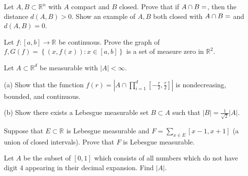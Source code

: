 
\begin{problem}{1}
  Let $A,B \subset \mathbb{R}^{n}$ with $A$ compact and $B$ closed. Prove that if $A \cap B = \empty$, then the distance $d(A,B) > 0$.
  Show an example of $A,B$ both closed with $A \cap B = \empty$ and $d(A,B) = 0$.
\end{problem} 

\begin{solution}
  

  
\end{solution}

\begin{problem}{2}
  Let $ f : [a,b] \to \mathbb{R}^{} $ be continuous. Prove the graph of $f, G(f) = \left\{ (x,f(x)) : x \in [a,b] \right\}$ is a set of measure zero in $\mathbb{R}^{2}$.
\end{problem}
    
\begin{solution}
\end{solution}

\begin{problem}{3}
Let $A \subset \mathbb{R}^{d}$ be measurable with $|A| < \infty$.

(a) Show that the function $f(r) = \left| A \cap \prod_{i=1}^{d } [-\frac{r}{2}, \frac{r}{2}] \right|$ is nondecreasing, bounded, and continuous.

(b) Show there exists a Lebesgue measurable set $B \subset A$ such that $\left| B \right| = \frac{1}{\sqrt{2} } \left| A \right|$.
\end{problem}

\begin{solution}
\end{solution}

\begin{problem}{4}
Suppose that $E \subset \mathbb{R}^{}$ is Lebesgue measurable and $F = \sum_{x \in E}^{} \left[ x-1,x+1 \right]$ (a union of closed intervals).
Prove that $F$ is Lebesgue measurable.
\end{problem}

\begin{solution}
\end{solution}

\begin{problem}{5}
Let $A$ be the subset of $\left[ 0,1 \right]$ which consists of all numbers which do not have digit $4$ appearing in their decimal expansion.
Find $\left| A \right|$.
\end{problem}

